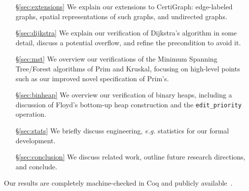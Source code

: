 \begin{itemize}
    \item[\S\ref{sec:extensions}] We explain our extensions to CertiGraph:
    edge-labeled graphs, spatial representations of such graphs, and
    undirected graphs.
    \item[\S\ref{sec:dijkstra}] We explain our verification of Dijkstra's algorithm in some detail, discuss a potential overflow, and refine the precondition to avoid it. %
    \item[\S\ref{sec:mst}] We overview our verifications of the Minimum Spanning Tree/Forest algorithms of Prim and Kruskal, focusing on high-level points such as our improved novel specification of Prim's.
    \item[\S\ref{sec:binheap}] We overview our verification of binary heaps, including a discussion of Floyd's bottom-up heap construction and the \texttt{edit\_priority} operation.
    \item[\S\ref{sec:stats}] We briefly discuss engineering, \emph{e.g.} statistics for our formal development.
    \item[\S\ref{sec:conclusion}] We discuss related work, outline future research directions, and conclude.
\end{itemize}
\vspace*{-0.25em}

\noindent Our results are completely machine-checked in Coq and publicly available~\cite{mohan_anshuman_2021_4744665}.%
